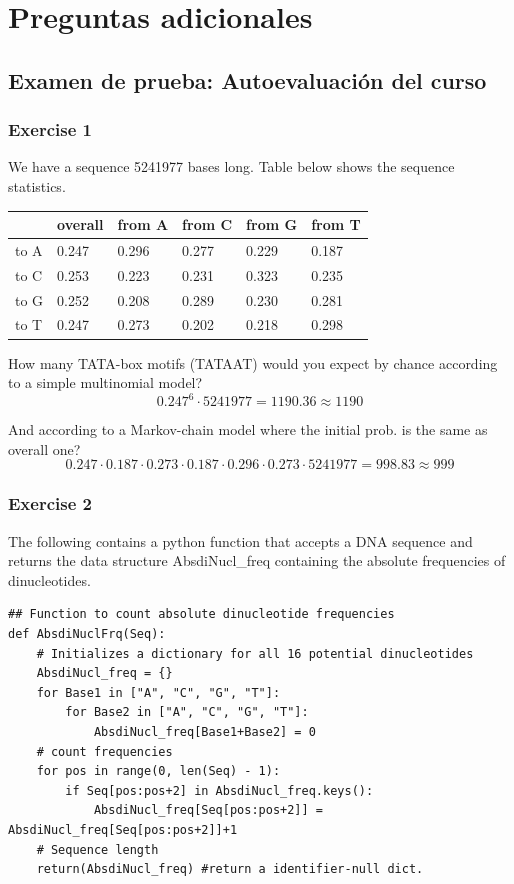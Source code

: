 \chapter{Preguntas adicionales}
\section{Examen de prueba: Autoevaluación del curso}
\subsection{Exercise 1}
We have a sequence 5241977 bases long. Table below shows the sequence statistics.

\begin{table}[htbp]
\centering
\begin{tabular}{l | l l l l l }
& overall & from A & from C & from G & from T \\ \hline
to A & 0.247 & 0.296 & 0.277 & 0.229 & 0.187 \\
to C & 0.253 & 0.223 & 0.231 & 0.323 & 0.235 \\
to G & 0.252 & 0.208 & 0.289 & 0.230 & 0.281 \\
to T & 0.247 & 0.273 & 0.202 & 0.218 & 0.298
\end{tabular}
\end{table}

How many TATA-box motifs (TATAAT) would you expect by chance according to a simple multinomial model?
$$ 0.247^6 \cdot 5241977 = 1190.36 \approx 1190 $$

And according to a Markov-chain model where the initial prob. is the same as overall one?
$$0.247 \cdot 0.187 \cdot 0.273 \cdot 0.187 \cdot 0.296 \cdot 0.273 \cdot 5241977 = 998.83 \approx 999 $$

\subsection{Exercise 2}
The following contains a python function that accepts a DNA sequence and returns the data structure AbsdiNucl\_freq containing the absolute frequencies of dinucleotides. 

\begin{lstlisting}
## Function to count absolute dinucleotide frequencies
def AbsdiNuclFrq(Seq):
	# Initializes a dictionary for all 16 potential dinucleotides
	AbsdiNucl_freq = {}
	for Base1 in ["A", "C", "G", "T"]:
		for Base2 in ["A", "C", "G", "T"]:
			AbsdiNucl_freq[Base1+Base2] = 0
	# count frequencies
	for pos in range(0, len(Seq) - 1):
		if Seq[pos:pos+2] in AbsdiNucl_freq.keys():
			AbsdiNucl_freq[Seq[pos:pos+2]] = AbsdiNucl_freq[Seq[pos:pos+2]]+1
	# Sequence length
	return(AbsdiNucl_freq) #return a identifier-null dict.
\end{lstlisting}

